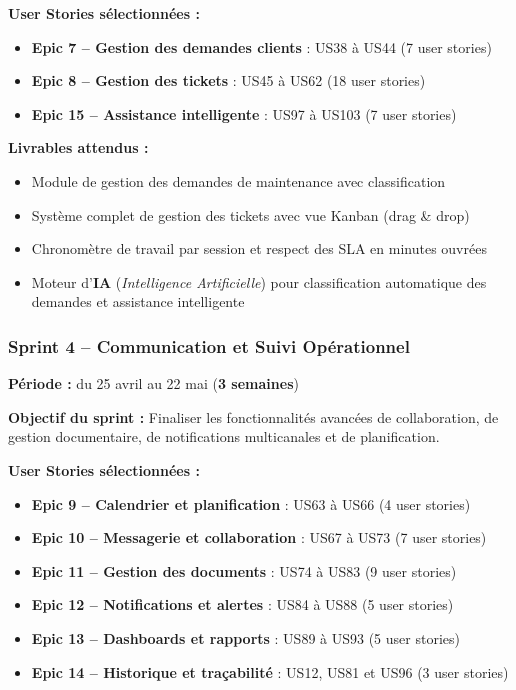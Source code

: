\noindent\textbf{User Stories sélectionnées :}
\begin{itemize}[nosep,leftmargin=1.6cm,topsep=0pt,itemsep=2pt,label=$\bullet$]
  \item \textbf{Epic 7 -- Gestion des demandes clients} : US38 à US44 (7 user stories)
  \item \textbf{Epic 8 -- Gestion des tickets} : US45 à US62 (18 user stories)
  \item \textbf{Epic 15 -- Assistance intelligente} : US97 à US103 (7 user stories)
\end{itemize}

\noindent\textbf{Livrables attendus :}
\begin{itemize}[nosep,leftmargin=1.6cm,topsep=0pt,itemsep=2pt,label=$\bullet$]
  \item Module de gestion des demandes de maintenance avec classification
  \item Système complet de gestion des tickets avec vue Kanban (drag \& drop)
  \item Chronomètre de travail par session et respect des SLA en minutes ouvrées
  \item Moteur d'\textbf{IA} (\textit{Intelligence Artificielle}) pour classification automatique des demandes et assistance intelligente
\end{itemize}
\newpage
\subsubsection{Sprint 4 -- Communication et Suivi Opérationnel}
\textbf{Période :} du 25 avril au 22 mai (\textbf{3 semaines})
\par\noindent\textbf{Objectif du sprint :} Finaliser les fonctionnalités avancées de
collaboration, de gestion documentaire, de notifications multicanales et de
planification.

\noindent\textbf{User Stories sélectionnées :}
\begin{itemize}[nosep,leftmargin=1.6cm,topsep=0pt,itemsep=2pt,label=$\bullet$]
  \item \textbf{Epic 9 -- Calendrier et planification} : US63 à US66 (4 user stories)
  \item \textbf{Epic 10 -- Messagerie et collaboration} : US67 à US73 (7 user stories)
  \item \textbf{Epic 11 -- Gestion des documents} : US74 à US83 (9 user stories)
  \item \textbf{Epic 12 -- Notifications et alertes} : US84 à US88 (5 user stories)
  \item \textbf{Epic 13 -- Dashboards et rapports} : US89 à US93 (5 user stories)
  \item \textbf{Epic 14 -- Historique et traçabilité} : US12, US81 et US96 (3 user stories)
\end{itemize}

